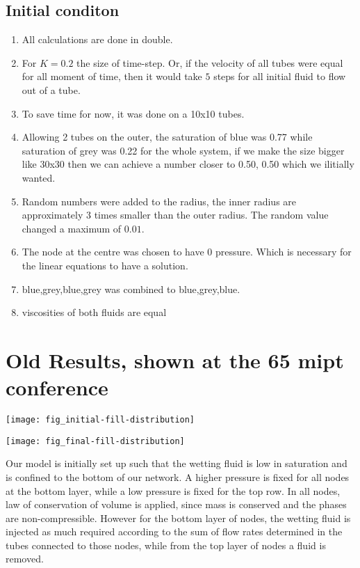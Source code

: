	\subsection{Initial conditon}
		\begin{enumerate}
			\item All calculations are done in double.
			\item For $K = 0.2$  the size of time-step. Or, if the velocity of all tubes were equal for all moment of time, then it would take $5$ steps for all initial fluid to flow out of a tube.
			\item To save time for now, it was done on a 10x10 tubes.
			\item Allowing 2 tubes on the outer, the saturation of blue was 0.77 while saturation of grey was 0.22 for the whole system, if we make the size bigger like 30x30 then we can achieve a number closer to 0.50, 0.50 which we ilitially wanted. 
			\item Random numbers were added to the radius, the inner radius are approximately 3 times smaller than the outer radius. The random value changed a maximum of $0.01$.
			\item The node at the centre was chosen to have 0 pressure. Which is necessary for the linear equations to have a solution.
			\item blue,grey,blue,grey was combined to blue,grey,blue.
			\item viscosities of both fluids are equal
		\end{enumerate}
		
		
\section{Old Results, shown at the 65 mipt conference}

\texttt{[image: fig\_initial-fill-distribution]}


\texttt{[image: fig\_final-fill-distribution]}

Our model is initially set up such that the wetting fluid is low in saturation and is confined to the bottom of our network. A higher pressure is fixed for all nodes at the bottom layer, while a  low pressure is fixed for the top row. In all nodes, law of conservation of volume is applied, since mass is conserved and the phases are non-compressible. However for the bottom layer of nodes, the wetting fluid is injected as much required according to the sum of flow rates determined in the tubes connected to those nodes, while from the top layer of nodes a fluid is removed.

